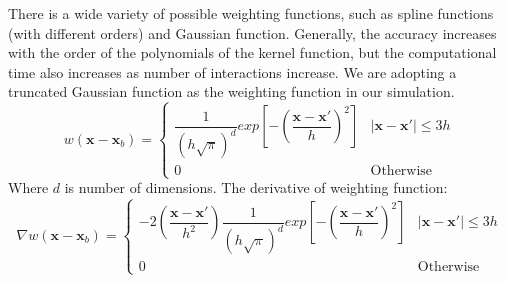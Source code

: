 \documentclass[journal abbreviation, manuscript]{copernicus}
\begin{document}
There is a wide variety of possible weighting functions, such as spline functions (with different orders) and Gaussian function. Generally, the accuracy increases with the order of the polynomials of the kernel function, but the computational time also increases as number of interactions increase. 
We are adopting a truncated Gaussian function as the weighting function in our simulation.
\begin{equation}
w(\textbf{x} - \textbf{x}_b) = 
\begin{cases} 
      \dfrac{1}{(h \sqrt{\pi})^d} exp [- (\dfrac{\textbf{x} - \textbf{x} \prime}{h})^2 ] &  \vert \textbf{x} - \textbf{x} \prime \vert \leq 3h\\
      0 & \text{Otherwise}
\end{cases}
\label{eq:SPH-kernel}
\end{equation}
Where $d$ is number of dimensions.
The derivative of weighting function:
\begin{equation}
\nabla w(\textbf{x} - \textbf{x}_b) = 
\begin{cases} 
      -2(\dfrac{\textbf{x} - \textbf{x} \prime}{h^2}) \dfrac{1}{(h \sqrt{\pi})^d} exp [- (\dfrac{\textbf{x} - \textbf{x} \prime}{h})^2 ] &  \vert \textbf{x} - \textbf{x} \prime \vert \leq 3h\\
      0 & \text{Otherwise}
\end{cases}
\end{equation}
\end{document}
